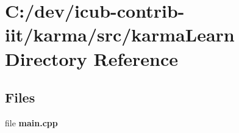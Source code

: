 \section{C\+:/dev/icub-\/contrib-\/iit/karma/src/karma\+Learn Directory Reference}
\label{dir_f234616accb428072e31fe708f34c8ab}
\subsection*{Files}
\begin{DoxyCompactItemize}
\item 
file {\bfseries main.\+cpp}
\end{DoxyCompactItemize}
